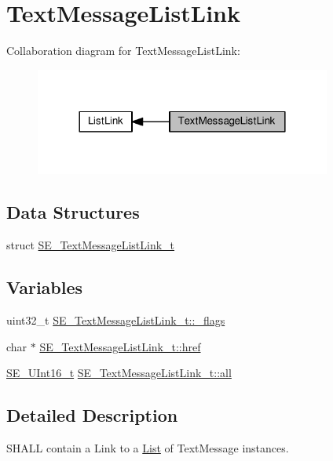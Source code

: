 \hypertarget{group__TextMessageListLink}{}\section{Text\+Message\+List\+Link}
\label{group__TextMessageListLink}
Collaboration diagram for Text\+Message\+List\+Link\+:\nopagebreak
\begin{figure}[H]
\begin{center}
\leavevmode
\includegraphics[width=276pt]{group__TextMessageListLink}
\end{center}
\end{figure}
\subsection*{Data Structures}
\begin{DoxyCompactItemize}
\item 
struct \hyperlink{structSE__TextMessageListLink__t}{S\+E\+\_\+\+Text\+Message\+List\+Link\+\_\+t}
\end{DoxyCompactItemize}
\subsection*{Variables}
\begin{DoxyCompactItemize}
\item 
uint32\+\_\+t \hyperlink{group__TextMessageListLink_ga4c7b708274f34d0f2b39ba2e2c0c53f4}{S\+E\+\_\+\+Text\+Message\+List\+Link\+\_\+t\+::\+\_\+flags}
\item 
char $\ast$ \hyperlink{group__TextMessageListLink_ga22a6b9bc1e90770e410f8c3e34bfa734}{S\+E\+\_\+\+Text\+Message\+List\+Link\+\_\+t\+::href}
\item 
\hyperlink{group__UInt16_gac68d541f189538bfd30cfaa712d20d29}{S\+E\+\_\+\+U\+Int16\+\_\+t} \hyperlink{group__TextMessageListLink_ga5e20ed8e4656cb69f86839b6c5297f98}{S\+E\+\_\+\+Text\+Message\+List\+Link\+\_\+t\+::all}
\end{DoxyCompactItemize}


\subsection{Detailed Description}
S\+H\+A\+LL contain a Link to a \hyperlink{structList}{List} of Text\+Message instances. 

